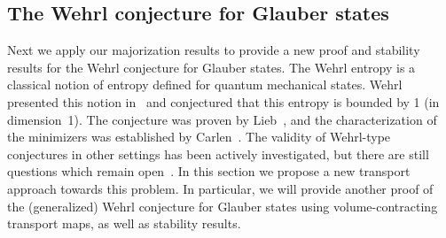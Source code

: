 \documentclass[AHL,Unicode,longabstracts]{cedram}
\begin{document}
\subsection{The Wehrl conjecture for Glauber states}\label{subsec:Wehrl_intro}
Next we apply our majorization results to provide a new proof and stability results for the Wehrl conjecture for Glauber states. The Wehrl entropy is a classical notion of entropy defined for quantum mechanical states. Wehrl presented this notion in~\cite{wehrl1979relation} and conjectured that this entropy is bounded by 1 (in dimension~1). The conjecture was proven by Lieb~\cite{MR0506364}, and the characterization of the minimizers was established by Carlen~\cite{MR1105661}. The validity of Wehrl-type conjectures in other settings has been actively investigated, but there are still questions which remain open~\cite{MR4580699,kulikov2022monotonicity}. In this section we propose a new transport approach towards this problem. In particular, we will provide another proof of the (generalized) Wehrl conjecture for Glauber states using volume-contracting transport maps, as well as stability results.
\end{document}
